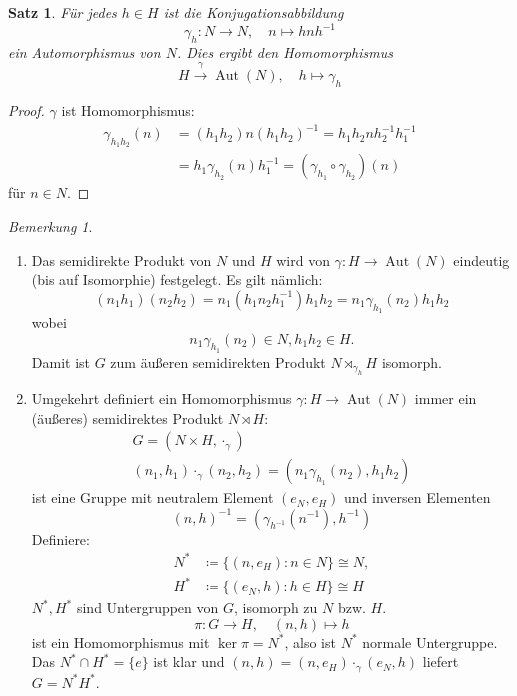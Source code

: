 \documentclass[12pt]{scrartcl} %
\DeclareMathOperator{\Aut}{Aut}
\newcommand{\inv}[1]{\left(#1\right)^{-1}}
\newcommand{\Inv}[1]{#1^{-1}}
\newtheorem{thm}{Satz}
\theoremstyle{definition}
\theoremstyle{remark}
\newtheorem*{nb}{Bemerkung}
\begin{document}
\begin{thm}
	Für jedes $h\in H$ ist die Konjugationsabbildung $$\gamma_h: N\to N, \quad n\mapsto hn\Inv{h}$$ ein Automorphismus von $N$.
	Dies ergibt den Homomorphismus $$H\overset{\gamma}{\longrightarrow} \Aut(N), \quad h\mapsto \gamma_h$$
\end{thm}

\begin{proof}
	$\gamma$ ist Homomorphismus:
	\begin{align*}
		\gamma_{h_1h_2}(n)&=(h_1h_2)n\inv{h_1h_2}=h_1h_2n\Inv{h_2}\Inv{h_1} \\
		&= h_1\gamma_{h_2}(n)\Inv{h_1}=(\gamma_{h_1}\circ\gamma_{h_2})(n)
	\end{align*}
	für $n\in N$.
\end{proof}

\begin{nb}
	\begin{enumerate}[label=(\arabic*)]
	\item Das semidirekte Produkt von $N$ und $H$ wird von $\gamma: H\to \Aut(N)$ eindeutig (bis auf Isomorphie) festgelegt.
		Es gilt nämlich: $$(n_1h_1)(n_2h_2)=n_1(h_1n_2\Inv{h_1})h_1h_2=n_1\gamma_{h_1}(n_2)h_1h_2$$ wobei $$n_1\gamma_{h_1}(n_2)\in N, h_1h_2\in H.$$
                Damit ist $G$ zum äußeren semidirekten Produkt $N \rtimes_{\gamma_h} H$ isomorph.
	\item Umgekehrt definiert ein Homomorphismus $\gamma: H\to\Aut(N)$ immer ein (äußeres) semidirektes Produkt $N\rtimes H$:
		\begin{gather*}
			G=(N\times H, \cdot_\gamma) \\
			(n_1,h_1)\cdot_\gamma (n_2,h_2)=(n_1\gamma_{h_1}(n_2), h_1h_2)
		\end{gather*}
		ist eine Gruppe mit neutralem Element $(e_N, e_H)$ und inversen Elementen $$\Inv{(n,h)}=(\gamma_{\Inv{h}}(\Inv{n}),\Inv{h})$$
		Definiere:
		\begin{align*}
			N^*&\coloneqq \{(n, e_H): n\in N\} \cong N, \\
			H^*&\coloneqq \{(e_N, h): h\in H\} \cong H
		\end{align*}
		$N^*,H^*$ sind Untergruppen von $G$, isomorph zu $N$ bzw. $H$.
		$$\pi: G\longrightarrow H, \quad (n,h)\mapsto h$$ ist ein Homomorphismus mit $\ker \pi = N^*$, also ist $N^*$ normale Untergruppe.
		Das $N^*\cap H^* = \{e\}$ ist klar und $(n,h)=(n,e_H)\cdot_\gamma (e_N, h)$ liefert $G=N^*H^*$.
	\end{enumerate}
\end{nb}
\end{document}
